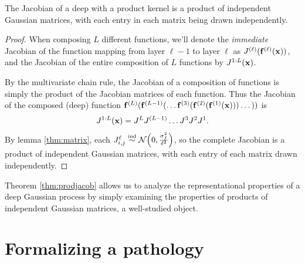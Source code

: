 \documentclass[twoside]{article}
\makeatletter
\newlength{\nonHumbleHeight}
\def\@humbleformat#1{{\settoheight{\nonHumbleHeight}{#1}\resizebox{!}{0.94\nonHumbleHeight}{#1}}}%
\newcommand\humble[1]{{\@humbleformat{#1}}}%
\newcommand{\gp}{{\humble{GP}}}
\newcommand{\layerindex}{\ell}
\newcommand{\sectiondist}{}
\makeatother
\begin{document}
\begin{theorem}
\label{thm:prodjacob}
The Jacobian of a deep \gp{} with a product kernel is a product of independent Gaussian matrices, with each entry in each matrix being drawn independently.
\end{theorem}
%
\begin{proof}
When composing $L$ different functions, we'll denote the \emph{immediate} Jacobian of the function mapping from layer $\layerindex -1$ to layer $\layerindex$ as $J^{(\layerindex)}(\vf^{(\layerindex)}(\vx))$, and the Jacobian of the entire composition of $L$ functions by $J^{1:L}({\bf{x}})$.

By the multivariate chain rule, the Jacobian of a composition of functions is simply the product of the Jacobian matrices of each function.  
%
Thus the Jacobian of the composed (deep) function ${\bf{f}}^{(L)}({\bf{f}}^{(L-1)}(\dots {\bf{f}}^{(3)}( {\bf{f}}^{(2)}( {\bf{f}}^{(1)}({\bf{x}})))\dots))$ is
%
%
\begin{align}
 J^{1:L}({\bf{x}}) 
= J^L J^{(L-1)} \dots J^3 J^2 J^1. 
\end{align}
%
By lemma \ref{thm:matrix}, each ${J^\layerindex_{i,j} \simind \Nt{0}{\frac{\sigma^2_f}{\layerindex^2}}}$, so the complete Jacobian is a product of independent Gaussian matrices, with each entry of each matrix drawn independently.
\end{proof}

\vspace{-0.1in}
Theorem \ref{thm:prodjacob} allows us to analyze the representational properties of a deep Gaussian process by simply examining the properties of products of independent Gaussian matrices, a well-studied object.






\section{Formalizing a pathology}
\sectiondist
\label{sec:formalizing-pathology}
\end{document}
